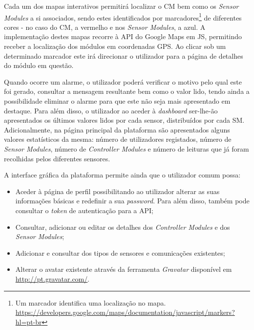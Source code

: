 Cada um dos mapas interativos permitirá localizar o \acl{CM} bem como os \textit{Sensor Modules} a si associados, sendo estes identificados por marcadores\footnote{Um marcador identifica uma localização no mapa. \\ \url{https://developers.google.com/maps/documentation/javascript/markers?hl=pt-br}} de diferentes cores - no caso do \acl{CM}, a vermelho e nos \textit{Sensor Modules}, a azul. A implementação destes mapas recorre à \ac{API} do Google Maps em \ac{JS}, permitindo receber a localização dos módulos em coordenadas \ac{GPS}. Ao clicar sob um determinado marcador este irá direcionar o utilizador para a página de detalhes do módulo em questão. 


Quando ocorre um  alarme, o utilizador poderá verificar o motivo pelo qual este foi gerado, consultar a mensagem resultante bem como o valor lido, tendo ainda a possibilidade eliminar o alarme para que este não seja mais apresentado em destaque. Para além disso, o utilizador ao aceder à \textit{dashboard} ser-lhe-ão apresentados os últimos valores lidos por cada sensor, distribuídos por cada \acl{SM}. Adicionalmente, na página principal da plataforma são apresentados alguns valores estatísticos da mesma: número de utilizadores registados, número de \textit{Sensor Modules}, número de \textit{Controller Modules} e número de leituras que já foram recolhidas pelos diferentes sensores. 


A interface gráfica da plataforma permite ainda que o utilizador comum possa: 

\begin{itemize}
	\item Aceder à página de perfil possibilitando ao utilizador alterar as suas informações básicas e redefinir a sua \textit{password}. Para além disso, também pode consultar o \textit{token} de autenticação para a  \ac{API}; 
	
	\item Consultar, adicionar ou editar os detalhes dos \textit{Controller Modules} e dos \textit{Sensor Modules}; 
	
	\item Adicionar e consultar dos tipos de sensores e comunicações existentes; 
	
	\item Alterar o avatar existente através da ferramenta \textit{Gravatar} disponível em \url{http://pt.gravatar.com/}. 
\end{itemize}






